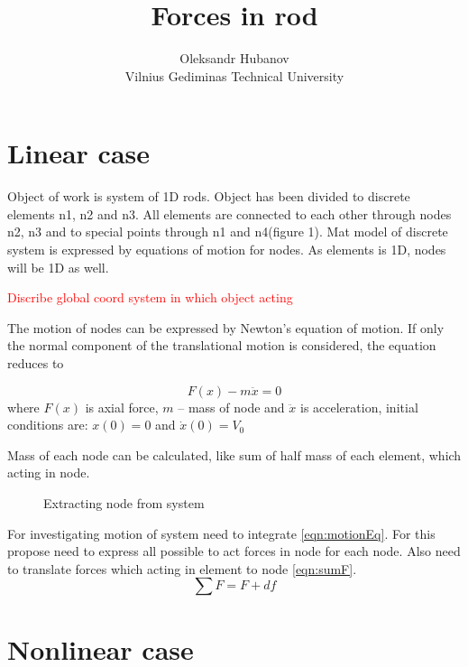 \documentclass[12pt]{article}
\begin{document}
\title{Forces in rod}
\author{Oleksandr Hubanov\\
Vilnius Gediminas Technical University}
\maketitle
\section {Linear case}
Object of work is system of 1D rods. Object has been divided to discrete elements n1, n2 and n3.
All elements are connected to each other through nodes n2, n3 and to special points through n1 and n4(figure 1).
Mat model of discrete system is expressed by equations of motion for nodes. As elements is 1D, nodes will be 1D as well. \par
\textcolor{red}{Discribe global coord system in which object acting} \par
The motion of nodes can be expressed by Newton's equation of motion. If only the normal component of the translational
motion is considered, the equation reduces to\par
\begin{equation}\label{eqn:motionEq}
   F(x)-m\ddot{x}=0
\end{equation}
where $F(x)$ is axial force, $m$ – mass of node and $\ddot{x}$ is acceleration, initial conditions are: $x(0)=0$ and $\dot{x}(0)=V_0$\par
Mass of each node can be calculated, like sum of half mass of each element, which acting in node.\par
\begin{figure}
  \centering
      
  \caption{Extracting node from system}    
\end{figure}
For investigating motion of system need to integrate \eqref{eqn:motionEq}. For this propose need to express all possible to act forces in node for each node.
Also need to translate forces which acting in element to node \eqref{eqn:sumF}. 
\begin{equation}\label{eqn:sumF}
   \sum F=F + df
\end{equation}

\pagebreak

\section {Nonlinear case}
\end{document}
